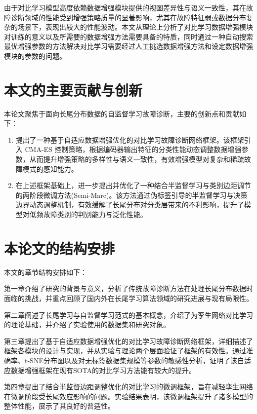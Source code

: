 \documentclass[master]{thesis-uestc}
\begin{document}
由于对比学习模型高度依赖数据增强模块提供的视图差异性与语义一致性，其在故障诊断领域的性能受到增强策略质量的显著影响，尤其在故障特征弱或数据分布复杂的场景下，表现出较大的性能波动。本文从理论上分析了对比学习数据增强模块对训练的意义以及所需要的数据增强方法需要具备的特质，同时通过一种自动搜索最优增强参数的方法解决对比学习需要经过人工挑选数据增强方法和设定数据增强模块的参数的问题。
\FloatBarrier  %

\section{本文的主要贡献与创新}

本论文聚焦于面向长尾分布数据的自监督学习故障诊断，主要的创新点和贡献如下：

\begin{enumerate}[label={(\arabic*)}]
    \item 提出了一种基于自适应数据增强优化的对比学习故障诊断网络框架。该框架引入 CMA-ES 控制策略，根据编码器输出特征的分类性能动态调整数据增强参数，从而提升增强策略的多样性与语义一致性，有效增强模型对复杂和稀疏故障模式的感知能力。
    
    \item 在上述框架基础上，进一步提出并优化了一种结合半监督学习与类别边距调节的两阶段微调方法(Semi-Marc)。该方法通过伪标签引导的半监督学习与决策边界动态调整机制，有效缓解了长尾分布对分类层带来的不利影响，提升了模型对低频故障类别的判别能力与泛化性能。
\end{enumerate}


\section{本论文的结构安排}

本文的章节结构安排如下：

第一章介绍了研究的背景与意义，分析了传统故障诊断方法在处理长尾分布数据时面临的挑战，并重点回顾了国内外在长尾学习算法领域的研究进展与现有局限性。

第二章阐述了长尾学习与自监督学习范式的基本概念，介绍了为孪生网络对比学习的理论基础，并介绍了实验使用的数据集和研究对象。

第三章提出了基于自适应数据增强优化的对比学习故障诊断网络框架，详细描述了框架各模块的设计与实现，并从实验与理论两个层面验证了框架的有效性。通过准确率、t-SNE分布图以及对无标签数据集规模等参数的敏感性分析，证明了该自适应数据增强框架在现有SOTA的对比学习方法能有较大的提升。

第四章提出了结合半监督边距调整优化的对比学习的微调框架，旨在减轻孪生网络在微调阶段受长尾效应影响的问题。实验结果表明，该微调框架提升了诸多模型的整体性能，展示了其良好的普适性。
\end{document}
